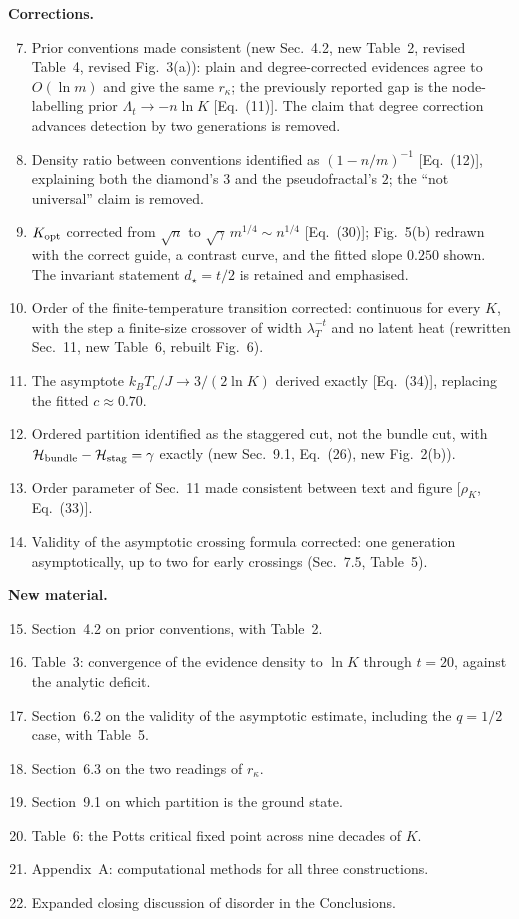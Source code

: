 \documentclass[11pt]{article}
\newcommand{\rk}{r_{\kappa}}
\begin{document}
\textbf{Corrections.}
\begin{enumerate}\setcounter{enumi}{6}
\item Prior conventions made consistent (new Sec.~4.2, new Table~2, revised
      Table~4, revised Fig.~3(a)): plain and degree-corrected evidences agree
      to $O(\ln m)$ and give the same $\rk$; the previously reported gap is the
      node-labelling prior $\Lambda_t\to-n\ln K$ [Eq.~(11)]. The claim that
      degree correction advances detection by two generations is removed.
\item Density ratio between conventions identified as $(1-n/m)^{-1}$
      [Eq.~(12)], explaining both the diamond's $3$ and the pseudofractal's
      $2$; the ``not universal'' claim is removed.
\item $K_{\rm opt}$ corrected from $\sqrt{n}$ to $\sqrt{\gamma}\,m^{1/4}\sim
      n^{1/4}$ [Eq.~(30)]; Fig.~5(b) redrawn with the correct guide, a contrast
      curve, and the fitted slope $0.250$ shown. The invariant statement
      $d_\star=t/2$ is retained and emphasised.
\item Order of the finite-temperature transition corrected: continuous for
      every $K$, with the step a finite-size crossover of width
      $\lambda_T^{-t}$ and no latent heat (rewritten Sec.~11, new Table~6,
      rebuilt Fig.~6).
\item The asymptote $k_BT_c/J\to3/(2\ln K)$ derived exactly [Eq.~(34)],
      replacing the fitted $c\approx0.70$.
\item Ordered partition identified as the staggered cut, not the bundle cut,
      with $\mathcal{H}_{\rm bundle}-\mathcal{H}_{\rm stag}=\gamma$ exactly
      (new Sec.~9.1, Eq.~(26), new Fig.~2(b)).
\item Order parameter of Sec.~11 made consistent between text and figure
      [$\rho_K$, Eq.~(33)].
\item Validity of the asymptotic crossing formula corrected: one generation
      asymptotically, up to two for early crossings (Sec.~7.5, Table~5).
\end{enumerate}

\textbf{New material.}
\begin{enumerate}\setcounter{enumi}{14}
\item Section~4.2 on prior conventions, with Table~2.
\item Table~3: convergence of the evidence density to $\ln K$ through $t=20$,
      against the analytic deficit.
\item Section~6.2 on the validity of the asymptotic estimate, including the
      $q=1/2$ case, with Table~5.
\item Section~6.3 on the two readings of $\rk$.
\item Section~9.1 on which partition is the ground state.
\item Table~6: the Potts critical fixed point across nine decades of $K$.
\item Appendix~A: computational methods for all three constructions.
\item Expanded closing discussion of disorder in the Conclusions.
\end{enumerate}
\end{document}
